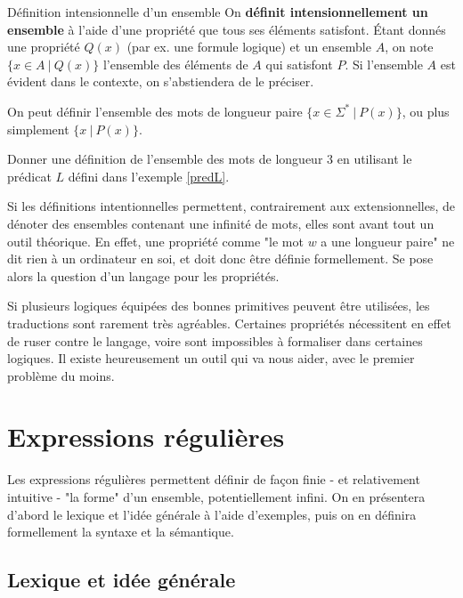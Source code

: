 \begin{definition}{Définition intensionnelle d'un ensemble}{}
On \textbf{définit intensionnellement un ensemble} à l'aide d'une propriété que tous ses éléments satisfont. Étant donnés une propriété $Q(x)$ (par ex. une formule logique) et un ensemble $A$, on note $\{x \in A~|~Q(x)\}$ l'ensemble des éléments de $A$ qui satisfont $P$. Si l'ensemble $A$ est évident dans le contexte, on s'abstiendera de le préciser.
\end{definition}

\begin{example}
On peut définir l'ensemble des mots de longueur paire $\{x \in \Sigma^*~|~P(x)\}$, ou plus simplement $\{x ~|~P(x)\}$.
\end{example}

\begin{exercice}
Donner une définition de l'ensemble des mots de longueur 3 en utilisant le prédicat $L$ défini dans l'exemple \ref{predL}. 
\end{exercice}

Si les définitions intentionnelles permettent, contrairement aux extensionnelles, de dénoter des ensembles contenant une infinité de mots, elles sont avant tout un outil théorique. En effet, une propriété comme "le mot $w$ a une longueur paire" ne dit rien à un ordinateur en soi, et doit donc être définie formellement. Se pose alors la question d'un langage pour les propriétés.

Si plusieurs logiques équipées des bonnes primitives peuvent être utilisées, les traductions sont rarement très agréables. Certaines propriétés nécessitent en effet de ruser contre le langage, voire sont impossibles à formaliser dans certaines logiques. Il existe heureusement un outil qui va nous aider, avec le premier problème du moins.

\chapter{Expressions régulières}
\label{regex}
Les expressions régulières permettent définir de façon finie - et relativement intuitive - "la forme" d'un ensemble, potentiellement infini. On en présentera d'abord le lexique et l'idée générale à l'aide d'exemples, puis on en définira formellement la syntaxe et la sémantique.

\section{Lexique et idée générale}


